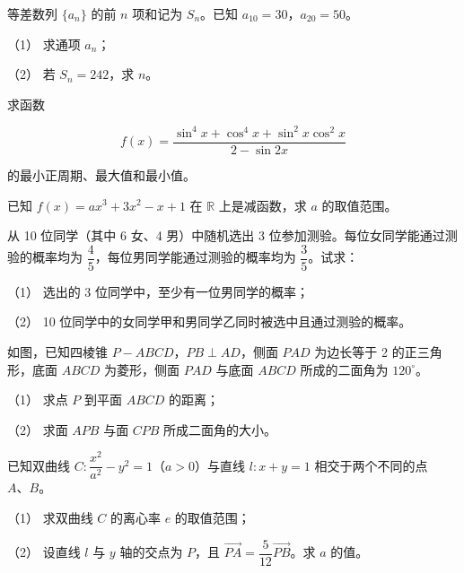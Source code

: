 \begin{question}
等差数列 $\{a_n\}$ 的前 $n$ 项和记为 $S_n$。已知 $a_{10}=30$，$a_{20}=50$。

（1） 求通项 $a_n$；

（2） 若 $S_n=242$，求 $n$。

\end{question}
\begin{question}
求函数

\nopagebreak[4]
\[
f(x)=\frac{\sin^4x+\cos^4x+\sin^2x\cos^2x}{2-\sin2x}
\]

的最小正周期、最大值和最小值。

\end{question}
\begin{question}
已知 $f(x)=ax^3+3x^2-x+1$ 在 $\mathbb R$ 上是减函数，求 $a$ 的取值范围。

\end{question}
\begin{question}
从 10 位同学（其中 6 女、4 男）中随机选出 3 位参加测验。每位女同学能通过测验的概率均为 $\dfrac45$，每位男同学能通过测验的概率均为 $\dfrac35$。试求：

（1） 选出的 3 位同学中，至少有一位男同学的概率；

（2） 10 位同学中的女同学甲和男同学乙同时被选中且通过测验的概率。

\Needspace{0.4\textheight}
\end{question}
\begin{question}
如图，已知四棱锥 $P-ABCD$，$PB\perp AD$，侧面 $PAD$ 为边长等于 2 的正三角形，底面 $ABCD$ 为菱形，侧面 $PAD$ 与底面 $ABCD$ 所成的二面角为 $120^\circ$。
\nopagebreak[4]
\begin{center}\end{center}
\nopagebreak[4]
（1） 求点 $P$ 到平面 $ABCD$ 的距离；

（2） 求面 $APB$ 与面 $CPB$ 所成二面角的大小。

\end{question}
\begin{question}
已知双曲线 $C:\dfrac{x^2}{a^2}-y^2=1$（$a>0$）与直线 $l:x+y=1$ 相交于两个不同的点 $A\text{、}B$。

（1） 求双曲线 $C$ 的离心率 $e$ 的取值范围；

（2） 设直线 $l$ 与 $y$ 轴的交点为 $P$，且 $\overrightarrow{PA}=\dfrac5{12}\overrightarrow{PB}$。求 $a$ 的值。

\end{question}